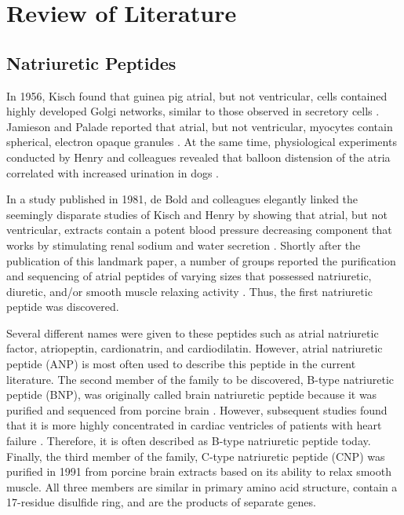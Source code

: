 \documentclass[14pt,a4paper,onecolumn]{extarticle}
\begin{document}
\clearpage
\section{Review of Literature}

\subsection{Natriuretic Peptides}


In 1956, Kisch found that guinea pig atrial, but not ventricular, cells contained highly developed Golgi networks, similar to those observed in secretory cells \citep{Kisch1956}. Jamieson and Palade reported that atrial, but not ventricular, myocytes contain spherical, electron opaque granules \citep{Jamieson1964}. At the same time, physiological experiments conducted by Henry and colleagues revealed that balloon distension of the atria correlated with increased urination in dogs \citep{Henry1956}.

In a study published in 1981, de Bold and colleagues elegantly linked the seemingly disparate studies of Kisch and Henry by showing that atrial, but not ventricular, extracts contain a potent blood pressure decreasing component that works by stimulating renal sodium and water secretion \citep{deBold1981}. Shortly after the publication of this landmark paper, a number of groups reported the purification and sequencing of atrial peptides of varying sizes that possessed natriuretic, diuretic, and/or smooth muscle relaxing activity \citep{Currie1984}  \citep{Flynn1983} \citep{Kangawa1984} \citep{Misono1984}. Thus, the first natriuretic peptide was discovered.

 Several different names were given to these peptides such as atrial natriuretic factor, atriopeptin, cardionatrin, and cardiodilatin. However, atrial natriuretic peptide (ANP) is most often used to describe this peptide in the current literature. The second member of the family to be discovered, B-type natriuretic peptide (BNP), was originally called brain natriuretic peptide because it was purified and sequenced from porcine brain \citep{Sudoh1988}. However, subsequent studies found that it is more highly concentrated in cardiac ventricles of patients with heart failure \citep{Mukoyama1991}  \citep{Mukoyama1990}. Therefore, it is often described as B-type natriuretic peptide today. Finally, the third member of the family, C-type natriuretic peptide (CNP) was purified in 1991 from porcine brain extracts based on its ability to relax smooth muscle. All three members are similar in primary amino acid structure, contain a 17-residue disulfide ring, and are the products of separate genes.\citep{Sudoh1990}
\end{document}
